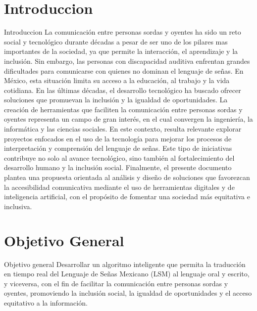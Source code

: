 \documentclass[12pt, oneside]{report}
\begin{document}


\tableofcontents

\chapter{Introduccion}
Introduccion
La comunicación entre personas sordas y oyentes ha sido un reto social y tecnológico durante décadas a pesar de ser uno de los pilares mas importantes de la sociedad, ya que permite la interacción, el aprendizaje y la inclusión. Sin embargo, las personas con discapacidad auditiva enfrentan grandes dificultades para comunicarse con quienes no dominan el lenguaje de señas. En México, esta situación limita su acceso a la educación, al trabajo y la vida cotidiana.
En las últimas décadas, el desarrollo tecnológico ha buscado ofrecer soluciones que promuevan la inclusión y la igualdad de oportunidades. La creación de herramientas que faciliten la comunicación entre personas sordas y oyentes representa un campo de gran interés, en el cual convergen la ingeniería, la informática y las ciencias sociales.
En este contexto, resulta relevante explorar proyectos enfocados en el uso de la tecnología para mejorar los procesos de interpretación y comprensión del lenguaje de señas. Este tipo de iniciativas contribuye no solo al avance tecnológico, sino también al fortalecimiento del desarrollo humano y la inclusión social.
Finalmente, el presente documento plantea una propuesta orientada al análisis y diseño de soluciones que favorezcan la accesibilidad comunicativa mediante el uso de herramientas digitales y de inteligencia artificial, con el propósito de fomentar una sociedad más equitativa e inclusiva.
\chapter{Objetivo General}
Objetivo general
Desarrollar un algoritmo inteligente que permita la traducción en tiempo real del Lenguaje de Señas Mexicano (LSM) al lenguaje oral y escrito, y viceversa, con el fin de facilitar la comunicación entre personas sordas y oyentes, promoviendo la inclusión social, la igualdad de oportunidades y el acceso equitativo a la información.
\end{document}
